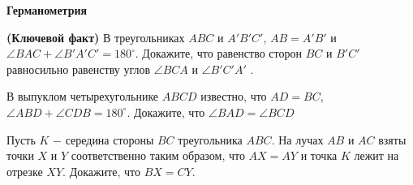 \centerline{\Huge \bf  Германометрия
}
\begin{flushright}
    \scriptsize{}
\end{flushright}

 \textbf{(Ключевой факт)} В треугольниках $ABC$ и $A'B'C'$, $AB = A'B'$ и $\angle BAC + \angle B'A'C' = 180^{\circ}$. Докажите, что равенство сторон $BC$ и $B'C'$ равносильно равенству углов $\angle BCA$ и $\angle B'C'A'$ .

 В выпуклом четырехугольнике $ABCD$ известно, что $AD=BC$, $\angle ABD + \angle CDB = 180^{\circ}$. Докажите, что $\angle BAD = \angle BCD$

 Пусть $K$ $-$ середина стороны $BC$ треугольника $ABC$. На лучах $AB$ и $AC$ взяты точки $X$ и $Y$ соответственно таким образом, что $AX = AY$ и точка $K$ лежит на отрезке $XY$. Докажите, что $BX = CY$.